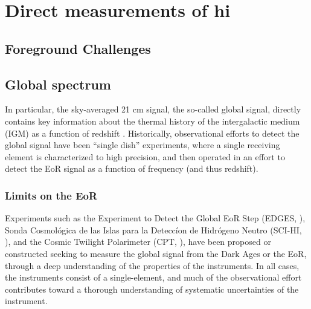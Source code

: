 \section{Direct measurements of {\sc hi}}
\label{sec:eor_intro_hi}

\subsection{Foreground Challenges}


\subsection{Global spectrum}


In particular, the sky-averaged 21 cm signal, the so-called global signal, directly
contains key information about the thermal history of the intergalactic medium
(IGM) as a function of redshift \citep{Pritchard.10}. Historically,
observational efforts to detect the global signal have been ``single dish''
experiments, where a single receiving element is characterized to high
precision, and then operated in an effort to detect the EoR signal as a function
of frequency (and thus redshift). 

\subsubsection{Limits on the EoR} %

Experiments such as the Experiment to Detect
the Global EoR Step (EDGES, \citealt{Bowman.10}), Sonda Cosmol\'{o}gica
de las Islas para la Detecc\'{i}on de Hidr\'{o}geno Neutro (SCI-HI,
\citealt{Voytek.14}), and the Cosmic Twilight Polarimeter (CPT,
\citealt{Nhan.16}), have been proposed or constructed seeking to measure
the global signal from the Dark Ages or the EoR, through a deep understanding of
the properties of the instruments. In all cases, the instruments consist of a
single-element, and much of the observational effort contributes toward a
thorough understanding of systematic uncertainties of the instrument. 

